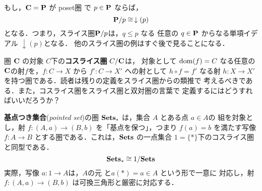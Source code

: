 \begin{enumerate}
       もし，${\bf C} = {\bf P}$ が poset圏
       で $p \in {\bf P}$ ならば，
       \[
	{\bf P}/p \cong\, \downarrow(p)
       \]
       となる．つまり，スライス圏${\bf P}/p$は，$q \leq p$ なる
       任意の $q \in {\bf P}$ からなる単項イデアル $\downarrow(p)$となる．
       他のスライス圏の例はすぐ後で見ることになる．

       圏 ${\bf C}$ の対象 $C$下の{\bfseries コスライス圏}
        $C/{\bf C}$は，
       対象として $\mathrm{dom}(f) = C$ なる任意の${\bf C}$の射$f$を，$f: C \to
       X$ から $f': C \to X'$ への射として $h \circ f = f'$ なる射 $h: X
       \to X'$ を持つ圏である．読者は残りの定義をスライス圏からの類推で
       考えるべきである．また，コスライス圏をスライス圏と双対圏の言葉で
       定義するにはどうすればいいだろうか？
\end{enumerate}
\begin{example}
 {\bfseries 基点つき集合}({\itshape pointed set})の圏
 $\mathbf{Sets}_*$ は，集合 $A$ とある点 $a\in A$の
 組を対象とし，射 $f: (A, a) \to (B, b)$ を「基点を保つ」，つまり
 $f(a) = b$ を満たす写像 $f: A \to B$ とする圏である．これは，$\mathbf{Sets}$ 
 の一点集合 $1 = \{*\}$下のコスライス圏と同型である．
 \[
  \mathbf{Sets}_* \cong 1/\mathbf{Sets}
 \]
 実際，写像 $a: 1 \to A$は，$A$の元 と$a(*) = a \in A$ という形で一意に
 対応し，射$f: (A, a) \to (B, b)$ は可換三角形と厳密に対応する．
 \begin{center}
 \end{center}
\end{example}
